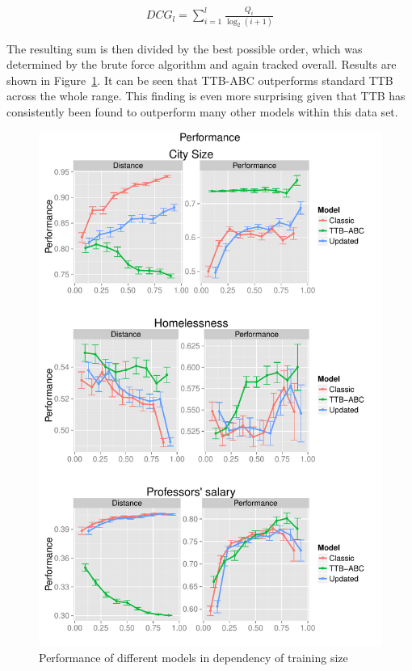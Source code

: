 \documentclass[a4paper,man, natbib]{apa6}
\begin{document}
\begin{align}
\label{eq:dcg}
DCG_l=\sum_{i=1}^{l}\frac{Q_i}{\log_2(i+1)}
\end{align}

The resulting sum is then divided by the best possible order, which was determined by the brute force algorithm and again tracked overall.
Results are shown in Figure~\ref{fig:performance}. It can be seen that TTB-ABC outperforms standard TTB across the whole range. This finding is even more surprising given that TTB has consistently been found to outperform many other models within this data set.

\begin{figure}[htb!]
  \caption{Performance of different models in dependency of training size}
\label{fig:performance}
  \centering
    \includegraphics[scale=0.7]{figs/performance.pdf}
\end{figure}
\end{document}
